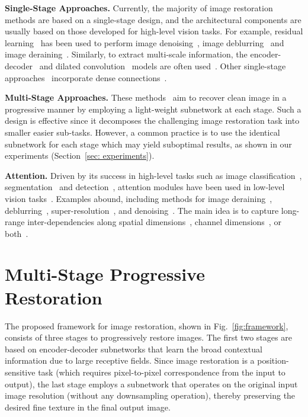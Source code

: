 \documentclass[10pt,twocolumn,letterpaper]{article}
\begin{document}
\vspace{0.4em}\noindent\textbf{Single-Stage Approaches.} Currently, the majority of image restoration methods are based on a single-stage design, and the architectural components are usually based on those developed for high-level vision tasks. 
For example, residual learning~\cite{he2016deep} has been used to perform image denoising~\cite{ntire2019_denoising,tian2020deep,DnCNN}, image deblurring~\cite{deblurgan,deblurganv2} and image deraining~\cite{mspfn2020}. 
Similarly, to extract multi-scale information, the encoder-decoder~\cite{ronneberger2015unet} and dilated convolution~\cite{yu2015multi} models are often used~\cite{RIDNet,CBDNet,deblurganv2}.
Other single-stage approaches~\cite{anwar2020densely,zhang2018density,zhang2020rdn} incorporate dense connections~\cite{huang2017densely}. 


\vspace{0.4em}\noindent\textbf{Multi-Stage Approaches.} These methods~\cite{fu2019lightweight,li2018recurrent,gopro2017,ren2019progressive,Maitreya2020,tao2018scale,dmphn2019,zheng2019residual} aim to recover clean image in a progressive manner by employing a light-weight subnetwork at each stage.
Such a design is effective since it decomposes the challenging image restoration task into smaller easier sub-tasks.
However, a common practice is to use the identical subnetwork for each stage which may yield suboptimal results, as shown in our experiments (Section~\ref{sec: experiments}). 

\vspace{0.4em}\noindent\textbf{Attention.} Driven by its success in high-level tasks such as image classification~\cite{hu2018gather,hu2019squeeze,woo2018cbam}, segmentation~\cite{fu2019dual,huang2019ccnet} and detection~\cite{wang2018non,woo2018cbam}, attention modules have been used in low-level vision tasks~\cite{khan2021transformers}. 
Examples abound, including methods for image deraining~\cite{mspfn2020,li2018recurrent}, deblurring~\cite{purohit2020region,Maitreya2020}, super-resolution~\cite{dai2019second,RCAN}, and denoising~\cite{RIDNet,zamir2020cycleisp}. 
The main idea is to capture long-range inter-dependencies along spatial dimensions~\cite{zhao2018psanet}, channel dimensions~\cite{hu2019squeeze}, or both~\cite{woo2018cbam}. 


\section{Multi-Stage Progressive Restoration}
\label{sec:method}
The proposed framework for image restoration, shown in Fig.~\ref{fig:framework}, consists of three stages to progressively restore images.
The first two stages are based on encoder-decoder subnetworks that learn the broad contextual information due to large receptive fields.
Since image restoration is a position-sensitive task (which requires pixel-to-pixel correspondence from the input to output), the last stage employs a subnetwork that operates on the original input image resolution (without any downsampling operation), thereby preserving the desired fine texture in the final output image.  
\end{document}
